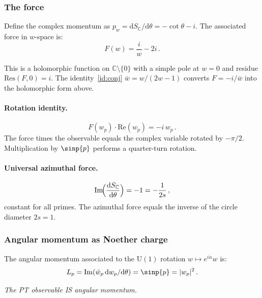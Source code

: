 \documentclass[12pt,a4paper]{article}
\begin{document}
\subsubsection{The force}

Define the complex momentum as
$p_w = \mathrm{d}S_{\mathbb{C}}/\mathrm{d}\theta = -\cot\theta - i$.
The associated force in $w$-space is:
\begin{equation}
  F(w) = \frac{i}{w} - 2i\,.
  \label{eq:force}
\end{equation}

This is a holomorphic function on $\mathbb{C} \setminus \{0\}$ with a
simple pole at $w = 0$ and residue $\mathrm{Res}(F, 0) = i$.
The identity~\ref{id:conj} $\bar{w} = w/(2w-1)$ converts
$F = -i/\bar{w}$ into the holomorphic form above.

\paragraph{Rotation identity.}
\begin{equation}
  F(w_p)\cdot\mathrm{Re}(w_p) = -i\,w_p\,.
  \label{eq:rotation}
\end{equation}
The force times the observable equals the complex variable rotated
by $-\pi/2$. Multiplication by $\sinp{p}$ performs a quarter-turn rotation.

\paragraph{Universal azimuthal force.}
\begin{equation}
  \mathrm{Im}\!\Bigl(\frac{\mathrm{d}S_{\mathbb{C}}}{\mathrm{d}\theta}\Bigr)
  = -1 = -\frac{1}{2s}\,,
  \label{eq:universal}
\end{equation}
constant for all primes. The azimuthal force equals the inverse of the
circle diameter $2s = 1$.

\subsubsection{Angular momentum as Noether charge}

The angular momentum associated to the $\mathrm{U}(1)$ rotation
$w \mapsto e^{i\alpha}w$ is:
\begin{equation}
  L_p = \mathrm{Im}(\bar{w}_p\,\mathrm{d}w_p/\mathrm{d}\theta)
  = \sinp{p} = |w_p|^2\,.
  \label{eq:angular_momentum}
\end{equation}

\emph{The PT observable IS angular momentum.}
\end{document}
